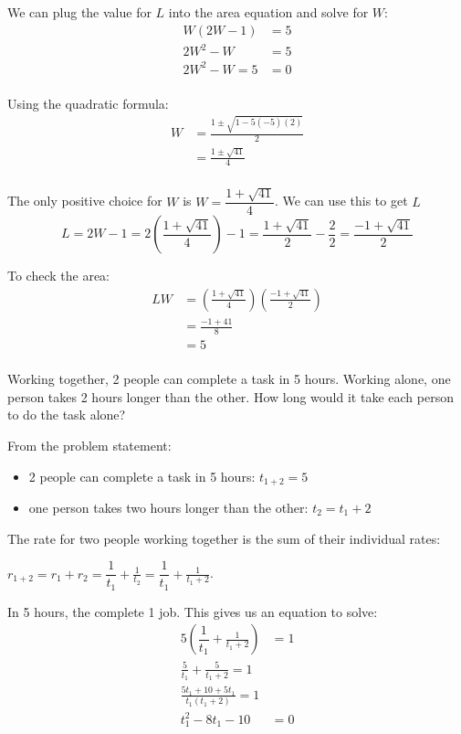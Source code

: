 \documentclass[fleqn,addpoints]{exam}
\begin{document}
\begin{questions}
\begin{solution}[9 cm]
We can plug the value for $L$ into the area equation and solve for $W$:
\begin{align*}
  W(2W-1) &= 5 \\
  2W^2-W &= 5 \\
  2W^2-W = 5 &= 0 \\
\end{align*}

Using the quadratic formula:
\begin{align*}
  W &= \frac{1 \pm \sqrt{1 - 5(-5)(2)}}{2} \\
  &= \frac{1 \pm \sqrt{41}}{4} \\
\end{align*}

The only positive choice for $W$ is $W = \dfrac{1 + \sqrt{41}}{4}$.  We can use this to get $L$
\[
  L = 2W-1 = 2 \left( \frac{1 + \sqrt{41}}{4} \right) - 1 = \frac{1 + \sqrt{41}}{2} - \frac{2}{2} = \frac{-1 + \sqrt{41}}{2}
\]

To check the area:
\begin{align*}
  LW &= \left( \frac{1 + \sqrt{41}}{4} \right) \left( \frac{-1 + \sqrt{41}}{2} \right) \\
  &= \frac{-1 + 41}{8} \\
  &= 5 \\
\end{align*}

\end{solution}

\question[10] 
Working together, 2 people can complete a task in 5 hours.  Working alone, one person takes 2 hours longer than the
other.  How long would it take each person to do the task alone?

\begin{solution}[9 cm]
From the problem statement:
\begin{itemize}
  \item 2 people can complete a task in 5 hours: $t_{1+2} = 5$
  \item one person takes two hours longer than the other: $t_2 = t_1 + 2$
\end{itemize}

The rate for two people working together is the sum of their individual rates: 

$r_{1+2} = r_1 + r_2 = \dfrac{1}{t_1} + \frac{1}{t_2} = \dfrac{1}{t_1} + \frac{1}{t_1+2}$.

In 5 hours, the complete 1 job.  This gives us an equation to solve:
\begin{align*}
  5 \left( \dfrac{1}{t_1} + \frac{1}{t_1+2} \right) &= 1 \\
  \frac{5}{t_1} + \frac{5}{t_1+2} = 1 \\
  \frac{5t_1 + 10 + 5t_1}{t_1(t_1+2)} = 1 \\
  t_1^2 - 8t_1 - 10 &= 0 \\
\end{align*}


\end{solution}
\end{questions}
\end{document}
